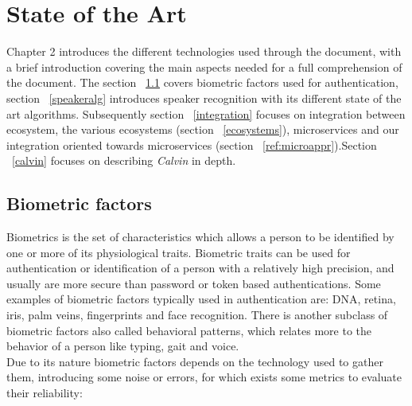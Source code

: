 \chapter{State of the Art}
\label{chap2}

Chapter 2 introduces the different technologies used through the document, with a brief
introduction covering the main aspects needed for a full comprehension of the document.
The section ~\ref{biofact} covers biometric factors used for
authentication, section ~\ref{speakeralg} introduces speaker recognition with its different state of
the art algorithms. Subsequently section ~\ref{integration} focuses on integration between ecosystem,
the various ecosystems (section ~\ref{ecosystems}), microservices and our
integration oriented towards microservices (section ~\ref{ref:microappr}).Section ~\ref{calvin}
focuses on describing \textit{Calvin} in depth.



\section{Biometric factors}
\label{biofact}

Biometrics is the set of characteristics which allows a person to be identified
by one or more of its physiological traits. Biometric traits can be used for
authentication or identification of a person with a relatively high precision, and
usually are more secure than password or token based authentications. Some examples
of biometric factors typically used in authentication are: DNA, retina, iris, palm
veins, fingerprints and face recognition. There is another subclass of biometric
factors also called behavioral patterns, which relates more to the behavior of a person
like typing, gait and voice.\\
Due to its nature biometric factors depends on the technology used to gather them,
introducing some noise or errors, for which exists some metrics to evaluate their
reliability:\pagebreak

